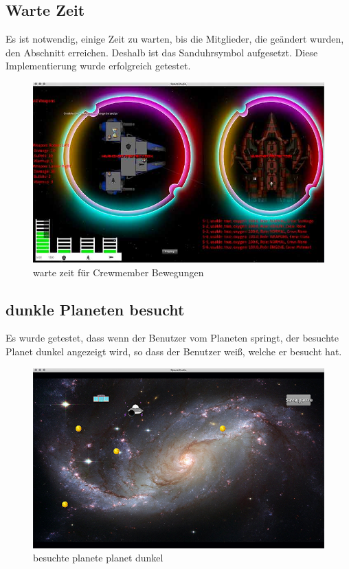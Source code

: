 \documentclass[12pt]{article}
\begin{document}
\subsection{Warte Zeit}
Es ist notwendig, einige Zeit zu warten, bis die Mitglieder, die geändert wurden, den Abschnitt erreichen. Deshalb ist das Sanduhrsymbol aufgesetzt. Diese Implementierung wurde erfolgreich getestet.
\begin{figure}[htp]
\centering
\includegraphics[scale=0.6]{TestProtocolBilder/timewaiting@0,25x.jpg}
\caption{warte zeit für Crewmember Bewegungen }
\end{figure}
\newpage
\subsection{dunkle Planeten besucht}
Es wurde getestet, dass wenn der Benutzer vom Planeten springt, der besuchte Planet dunkel angezeigt wird, so dass der Benutzer weiß, welche er besucht hat.
\begin{figure}[htp]
\centering
\includegraphics[scale=0.6]{TestProtocolBilder/besuchtePlanet.jpg}
\caption{besuchte planete planet dunkel  }
\end{figure}
\newpage
\end{document}
